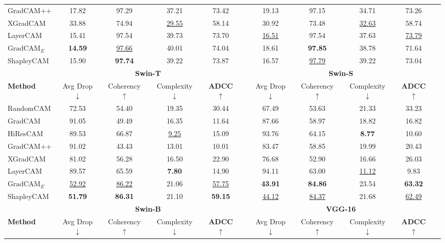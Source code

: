 \begin{table*}[htbp]
\begin{tabular}{l cccc c cccc c}
GradCAM++ & 17.82 & 97.29 & 37.21 & 73.42 & & 19.13 & 97.15 & 34.71 & 73.26 \\
XGradCAM & 33.88 & 74.94 & \underline{29.55} & 58.14 & & 30.92 & 73.48 & \underline{32.63} & 58.74 \\
LayerCAM & 15.41 & 97.54 & 39.73 & 73.70 & & \underline{16.51} & 97.54 & 37.63 & \underline{73.79} \\
$\text{GradCAM}_{E}$ & \textbf{14.59} & \underline{97.66} & 40.01 & 74.04 & & 18.61 & \textbf{97.85} & 38.78 & 71.64 \\
ShapleyCAM & 15.90 & \textbf{97.74} & 39.22 & 73.87 & & 16.57 & \underline{97.79} & 39.22 & 73.04 \\
\hline
& \multicolumn{4}{c}{\textbf{Swin-T}} & & \multicolumn{4}{c}{\textbf{Swin-S}} \\
\cline{2-5} \cline{7-10}
\textbf{Method} & Avg Drop $\downarrow$ & Coherency $\uparrow$ & Complexity $\downarrow$ & \textbf{ADCC} $\uparrow$ & & Avg Drop $\downarrow$ & Coherency $\uparrow$ & Complexity $\downarrow$ & \textbf{ADCC} $\uparrow$ \\
\hline
RandomCAM & 72.53 & 54.40 & 19.35 & 30.44 & & 67.49 & 53.63 & 21.33 & 33.23 \\
GradCAM & 91.05 & 49.49 & 16.35 & 11.64 & & 87.66 & 58.97 & 18.82 & 16.82 \\
HiResCAM & 89.53 & 66.87 & \underline{9.25} & 15.09 & & 93.76 & 64.15 & \textbf{8.77} & 10.60 \\
GradCAM++ & 91.02 & 43.43 & 13.01 & 10.01 & & 83.47 & 58.85 & 19.99 & 20.43 \\
XGradCAM & 81.02 & 56.28 & 16.50 & 22.90 & & 76.68 & 52.90 & 16.66 & 26.03 \\
LayerCAM & 89.57 & 65.59 & \textbf{7.80} & 14.90 & & 94.11 & 63.00 & \underline{11.12} & 9.83 \\
$\text{GradCAM}_{E}$ & \underline{52.92} & \underline{86.22} & 21.06 & \underline{57.75} & & \textbf{43.91} & \textbf{84.86} & 23.54 & \textbf{63.32} \\
ShapleyCAM & \textbf{51.79} & \textbf{86.31} & 21.10 & \textbf{59.15} & & \underline{44.12} & \underline{84.37} & 21.68 & \underline{62.49} \\
\hline
& \multicolumn{4}{c}{\textbf{Swin-B}} & & \multicolumn{4}{c}{\textbf{VGG-16}} \\
\cline{2-5} \cline{7-10}
\textbf{Method} & Avg Drop $\downarrow$ & Coherency $\uparrow$ & Complexity $\downarrow$ & \textbf{ADCC} $\uparrow$ & & Avg Drop $\downarrow$ & Coherency $\uparrow$ & Complexity $\downarrow$ & \textbf{ADCC} $\uparrow$ \\

\end{tabular}
\end{table*}
